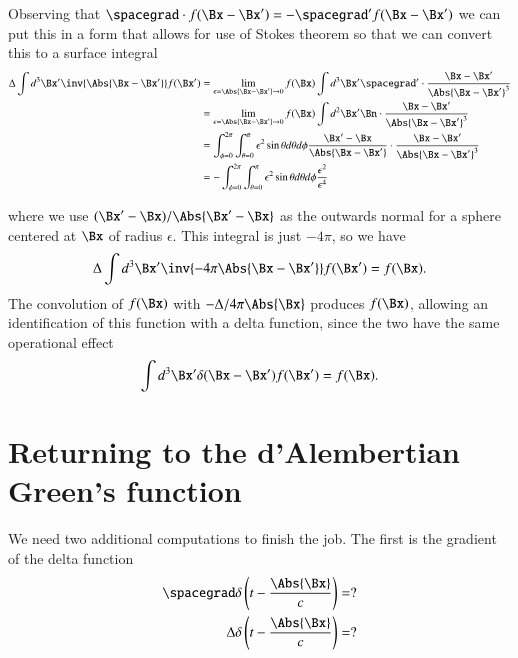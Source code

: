 Observing that \(\spacegrad \cdot f(\Bx -\Bx') = -\spacegrad' f(\Bx - \Bx')\) we can put this in a form that allows for use of Stokes theorem so that we can convert this to a surface integral
%
\begin{equation}\label{eqn:relativisticElectrodynamicsL18:820}
\begin{aligned}
\Delta \int d^3 \Bx' \inv{\Abs{\Bx - \Bx'} } f(\Bx')
&=
\lim_{\epsilon = \Abs{\Bx -\Bx'} \rightarrow 0}
f(\Bx) \int d^3 \Bx' \spacegrad' \cdot \frac{\Bx - \Bx'}{\Abs{\Bx - \Bx'}^3} \\
&=
\lim_{\epsilon = \Abs{\Bx -\Bx'} \rightarrow 0}
f(\Bx) \int d^2 \Bx' \Bn \cdot \frac{\Bx - \Bx'}{\Abs{\Bx - \Bx'}^3} \\
&= \int_{\phi=0}^{2\pi} \int_{\theta = 0}^\pi \epsilon^2 \sin\theta d\theta d\phi
\frac{\Bx' - \Bx}{\Abs{\Bx - \Bx'}} \cdot \frac{\Bx - \Bx'}{\Abs{\Bx - \Bx'}^3} \\
&= -\int_{\phi=0}^{2\pi} \int_{\theta = 0}^\pi \epsilon^2 \sin\theta d\theta d\phi \frac{\epsilon^2}{\epsilon^4}
\end{aligned}
\end{equation}

where we use \((\Bx' - \Bx)/\Abs{\Bx' - \Bx}\) as the outwards normal for a sphere centered at \(\Bx\) of radius \(\epsilon\).  This integral is just \(-4 \pi\), so we have
%
\begin{equation}\label{eqn:relativisticElectrodynamicsL18:360}
\Delta \int d^3 \Bx' \inv{-4 \pi \Abs{\Bx - \Bx'} } f(\Bx')
=
f(\Bx).
\end{equation}
The convolution of \(f(\Bx)\) with \(-\Delta/4 \pi \Abs{\Bx}\) produces \(f(\Bx)\), allowing an identification of this function with a delta function, since the two have the same operational effect
\begin{equation}\label{eqn:relativisticElectrodynamicsL18:380}
\int d^3 \Bx' \delta(\Bx - \Bx') f(\Bx')
=
f(\Bx).
\end{equation}
%
\section{Returning to the d'Alembertian Green's function}

We need two additional computations to finish the job.  The first is the gradient of the delta function
%
\begin{equation}\label{eqn:relativisticElectrodynamicsL18:840}
\begin{aligned}
\spacegrad \delta\left(t - \frac{\Abs{\Bx}}{c}\right) &= ? \\
\Delta \delta\left(t - \frac{\Abs{\Bx}}{c}\right) &= ?
\end{aligned}
\end{equation}

